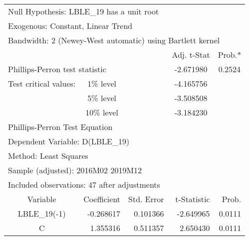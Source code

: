 \begin{tabular}{lrrrr}
\toprule
\multicolumn{3}{l}{Null Hypothesis: LBLE\_19 has a unit root}&\multicolumn{1}{c}{}&\multicolumn{1}{c}{}\\
\multicolumn{3}{l}{Exogenous: Constant, Linear Trend}&\multicolumn{1}{c}{}&\multicolumn{1}{c}{}\\
\multicolumn{5}{l}{Bandwidth: 2 (Newey-West automatic) using Bartlett kernel}\\
\midrule
\multicolumn{1}{c}{}&\multicolumn{1}{c}{}&\multicolumn{1}{c}{}&\multicolumn{1}{c}{Adj. t-Stat}&\multicolumn{1}{c}{Prob.*}\\
\midrule
\multicolumn{2}{l}{Phillips-Perron test statistic}&\multicolumn{1}{l}{}&\multicolumn{1}{c}{-2.671980}&\multicolumn{1}{c}{0.2524}\\
\multicolumn{1}{l}{Test critical values:}&\multicolumn{1}{c}{1\% level}&\multicolumn{1}{c}{}&\multicolumn{1}{c}{-4.165756}&\multicolumn{1}{c}{}\\
\multicolumn{1}{c}{}&\multicolumn{1}{c}{5\% level}&\multicolumn{1}{c}{}&\multicolumn{1}{c}{-3.508508}&\multicolumn{1}{c}{}\\
\multicolumn{1}{c}{}&\multicolumn{1}{c}{10\% level}&\multicolumn{1}{c}{}&\multicolumn{1}{c}{-3.184230}&\multicolumn{1}{c}{}\\
\midrule
\multicolumn{2}{l}{Phillips-Perron Test Equation}&\multicolumn{1}{c}{}&\multicolumn{1}{c}{}&\multicolumn{1}{c}{}\\
\multicolumn{3}{l}{Dependent Variable: D(LBLE\_19)}&\multicolumn{1}{c}{}&\multicolumn{1}{c}{}\\
\multicolumn{2}{l}{Method: Least Squares}&\multicolumn{1}{c}{}&\multicolumn{1}{c}{}&\multicolumn{1}{c}{}\\
\multicolumn{3}{l}{Sample (adjusted): 2016M02 2019M12}&\multicolumn{1}{c}{}&\multicolumn{1}{c}{}\\
\multicolumn{4}{l}{Included observations: 47 after adjustments}&\multicolumn{1}{c}{}\\
\midrule
\multicolumn{1}{c}{Variable}&\multicolumn{1}{r}{Coefficient}&\multicolumn{1}{r}{Std. Error}&\multicolumn{1}{r}{t-Statistic}&\multicolumn{1}{r}{Prob.}\\
\midrule
\multicolumn{1}{c}{LBLE\_19(-1)}&\multicolumn{1}{r}{-0.268617}&\multicolumn{1}{r}{0.101366}&\multicolumn{1}{r}{-2.649965}&\multicolumn{1}{r}{0.0111}\\
\multicolumn{1}{c}{C}&\multicolumn{1}{r}{1.355316}&\multicolumn{1}{r}{0.511357}&\multicolumn{1}{r}{2.650430}&\multicolumn{1}{r}{0.0111}\\

\end{tabular}
